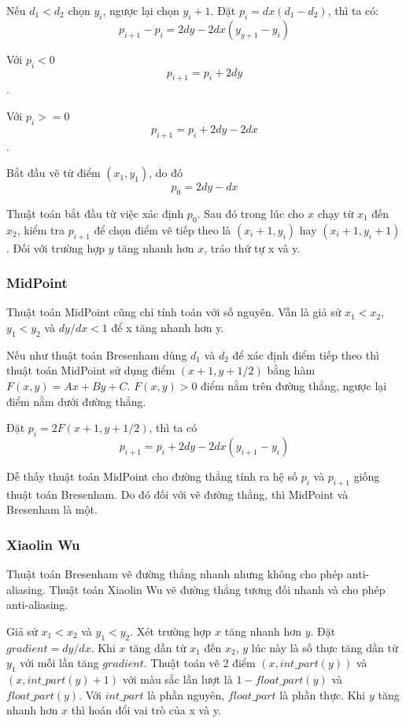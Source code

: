 \documentclass[12pt]{article}
\begin{document}
Nếu \(d_1 < d_2\) chọn \(y_i\), ngược lại chọn \(y_i + 1\).
Đặt \(p_i = dx(d_1 - d_2)\), thì ta có:
\[p_{i+1} - p_i = 2dy - 2dx(y_{y+1} - y_i)\]

Với \(p_i < 0\)
\[p_{i+1} = p_i + 2dy\].

Với \(p_i >= 0\)
\[p_{i+1} = p_i + 2dy - 2dx\].

Bắt đầu vẽ từ điểm \((x_1, y_1)\), do đó
\[p_0 = 2dy - dx\]

Thuật toán bắt đầu từ việc xác định \(p_0\).
Sau đó trong lúc cho \(x\) chạy từ \(x_1\) đến \(x_2\),
kiểm tra \(p_{i+1}\) để chọn điểm vẽ tiếp theo là
\((x_i + 1, y_i)\) hay \((x_i + 1, y_i + 1)\).
Đối với trường hợp \(y\) tăng nhanh hơn \(x\), tráo thứ tự x và y.

\subsubsection{MidPoint}
Thuật toán MidPoint cũng chỉ tính toán với số nguyên.
Vẫn là giả sử \(x_1 < x_2\), \(y_1 < y_2\) và \(dy/dx < 1\) để x tăng nhanh hơn y.

Nếu như thuật toán Bresenham dùng \(d_1\) và \(d_2\)
để xác định điểm tiếp theo thì thuật toán MidPoint sử dụng điểm \((x + 1, y + 1/2)\)
bằng hàm \(F(x, y) = Ax + By + C\).
\(F(x, y) > 0 \) điểm nằm trên đường thẳng, ngược lại điểm nằm dưới đường thẳng.

Đặt \(p_i = 2F(x + 1, y+ 1/2)\), thì ta có
\[p_{i+1} = p_i + 2dy - 2dx(y_{i+1} - y_i)\]

Dễ thấy thuật toán MidPoint cho đường thẳng tính ra hệ số \(p_i\) và \(p_{i+1}\)
giống thuật toán Bresenham. Do đó đối với vẽ đường thẳng, thì MidPoint và Bresenham là một.

\subsubsection{Xiaolin Wu}
Thuật toán Bresenham vẽ đường thẳng nhanh nhưng không cho phép anti-aliasing.
Thuật toán Xiaolin Wu vẽ đường thẳng tương đối nhanh và cho phép anti-aliasing.

Giả sử \(x_1 < x_2\) và \(y_1 < y_2\). Xét trường hợp \(x\) tăng nhanh hơn \(y\).
Đặt \(gradient = dy/dx\). Khi \(x\) tăng dần từ \(x_1\) đến \(x_2\),
\(y\) lúc này là số thực tăng dần từ \(y_1\) với mỗi lần tăng \(gradient\).
Thuật toán vẽ 2 điểm \((x, int\_part(y))\) và \((x, int\_part(y) + 1)\) với màu sắc lần lượt là
\(1 - float\_part(y)\) và \(float\_part(y)\). Với \(int\_part\) là phần nguyên, \(float\_part\) là phần thực.
Khi \(y\) tăng nhanh hơn \(x\) thì hoán đổi vai trò của x và y.
\end{document}
